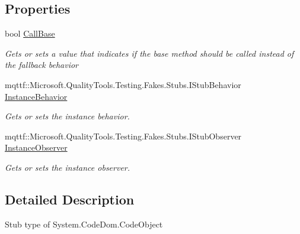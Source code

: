 \subsection*{Properties}
\begin{DoxyCompactItemize}
\item 
bool \hyperlink{class_system_1_1_code_dom_1_1_fakes_1_1_stub_code_object_a3a9f2f46264aff09134f8405eb25c2c7}{Call\-Base}
\begin{DoxyCompactList}\small\item\em Gets or sets a value that indicates if the base method should be called instead of the fallback behavior\end{DoxyCompactList}\item 
mqttf\-::\-Microsoft.\-Quality\-Tools.\-Testing.\-Fakes.\-Stubs.\-I\-Stub\-Behavior \hyperlink{class_system_1_1_code_dom_1_1_fakes_1_1_stub_code_object_a80cb82a1ae8d5f6825d387b52cf4c963}{Instance\-Behavior}
\begin{DoxyCompactList}\small\item\em Gets or sets the instance behavior.\end{DoxyCompactList}\item 
mqttf\-::\-Microsoft.\-Quality\-Tools.\-Testing.\-Fakes.\-Stubs.\-I\-Stub\-Observer \hyperlink{class_system_1_1_code_dom_1_1_fakes_1_1_stub_code_object_adc60fe2ed126b7798e130328600df006}{Instance\-Observer}
\begin{DoxyCompactList}\small\item\em Gets or sets the instance observer.\end{DoxyCompactList}\end{DoxyCompactItemize}


\subsection{Detailed Description}
Stub type of System.\-Code\-Dom.\-Code\-Object



